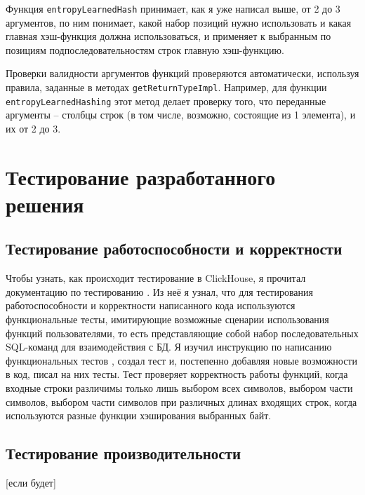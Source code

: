 \documentclass[a4paper,12pt]{extarticle}
\begin{document}
\begin{sloppypar}
Функция \texttt{entropyLearnedHash} принимает, как я уже написал выше, от 2 до 3 аргументов, по ним понимает, какой набор позиций нужно использовать и какая главная хэш-функция должна использоваться, и применяет к выбранным по позициям подпоследовательностям строк главную хэш-функцию.

Проверки валидности аргументов функций проверяются автоматически, используя правила, заданные в методах \texttt{getReturnTypeImpl}. Например, для функции \texttt{entropyLearnedHashing} этот метод делает проверку того, что переданные аргументы -- столбцы строк (в том числе, возможно, состоящие из 1 элемента), и их от 2 до 3.

\newpage

\section{Тестирование разработанного решения}
\subsection{Тестирование работоспособности и корректности}
Чтобы узнать, как происходит тестирование в ClickHouse, я прочитал документацию по тестированию \cite{clickhouse_testing}. Из неё я узнал, что для тестирования работоспособности и корректности написанного кода используются функциональные тесты, имитирующие возможные сценарии использования функций пользователями, то есть представляющие собой набор последовательных SQL-команд для взаимодействия с БД. Я изучил инструкцию по написанию функциональных тестов \cite{clickhouse_sql_test_queries}, создал тест и, постепенно добавляя новые возможности в код, писал на них тесты. Тест проверяет корректность работы функций, когда входные строки различимы только лишь выбором всех символов, выбором части символов, выбором части символов при различных длинах входящих строк, когда используются разные функции хэширования выбранных байт.

\cite{clickhouse_build_instruction}
\cite{clickhouse_architecture}
\cite{clickhouse_data_types}
\cite{clickhouse_reqular_functions}
\cite{clickhouse_aggregate_functions}
\cite{clickhouse_hash_functions}
\cite{clickhouse_hash_functions}
\cite{clickhouse_code_style_guide}
\cite{clickhouse_testing}
\cite{clickhouse_sql_test_queries}

\subsection{Тестирование производительности}
[если будет]


\end{sloppypar}
\end{document}
